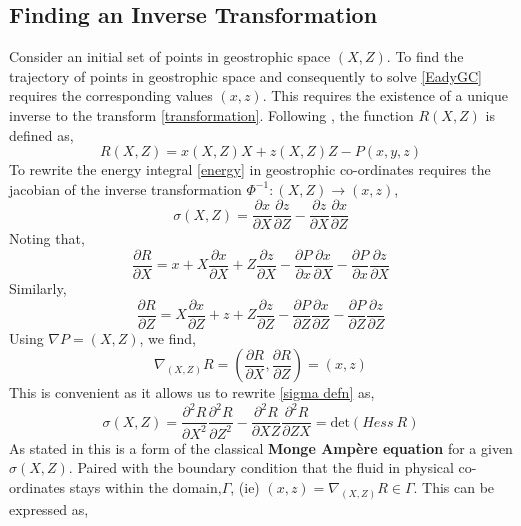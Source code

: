 \subsection{Finding an Inverse Transformation}
Consider an initial set of points in geostrophic space $(X,Z)$. To find the trajectory of points in geostrophic space and consequently to solve \ref{EadyGC} requires the corresponding values $\left(x,z\right)$. This requires the existence of a unique inverse to the transform \ref{transformation}. Following \cite{Cullen2006a}, the function $R(X,Z)$ is defined as,
\begin{equation*}
	R(X,Z) = x(X,Z)X+z(X,Z)Z - P(x,y,z)
\end{equation*}
To rewrite the energy integral \ref{energy} in geostrophic co-ordinates requires the jacobian of the inverse transformation $\Phi ^{-1}: (X,Z) \rightarrow (x,z)$, 
\begin{equation}
	\sigma(X,Z) = \frac{\partial x}{\partial X}\frac{\partial z}{\partial Z} - \frac{\partial z}{\partial X}\frac{\partial x}{\partial Z}
\label{sigma defn}
\end{equation}
Noting that,
\begin{equation*}
	\frac{\partial R}{\partial X} = x + X\frac{\partial x}{\partial X} + Z\frac{\partial z}{\partial X} -\frac{\partial P}{\partial x}\frac{\partial x}{\partial X} - \frac{\partial P}{\partial x}\frac{\partial z}{\partial X}
\end{equation*}
Similarly,
\begin{equation*}
\frac{\partial R}{\partial Z} = X\frac{\partial x}{\partial Z} + z + Z\frac{\partial z}{\partial Z} -\frac{\partial P}{\partial Z}\frac{\partial x}{\partial Z} - \frac{\partial P}{\partial Z}\frac{\partial z}{\partial Z}
\end{equation*}
Using $\nabla P = (X,Z)$, we find,
\begin{equation}
	\nabla_{(X,Z)} R = \left(\frac{\partial R}{\partial X},\frac{\partial R}{\partial Z}\right) = (x,z)
\end{equation}
This is convenient as it allows us to rewrite \ref{sigma defn} as,
\begin{equation}
\sigma(X,Z) = \frac{\partial^2 R}{\partial X^2}\frac{\partial^2 R}{\partial Z^2} -\frac{\partial^2 R}{\partial XZ}\frac{\partial^2 R}{\partial ZX} = \textrm{det}(Hess \ R)
\label{Monge Ampere}
\end{equation}
As stated in \cite{Cullen2006a} this is a form of the classical \textbf{Monge Amp\`{e}re equation} for a given $\sigma(X,Z)$. Paired with the boundary condition that the fluid in physical co-ordinates stays within the domain,$\Gamma$, (ie) $(x,z) = \nabla_{(X,Z)}R \in \Gamma$. This can be expressed as,
